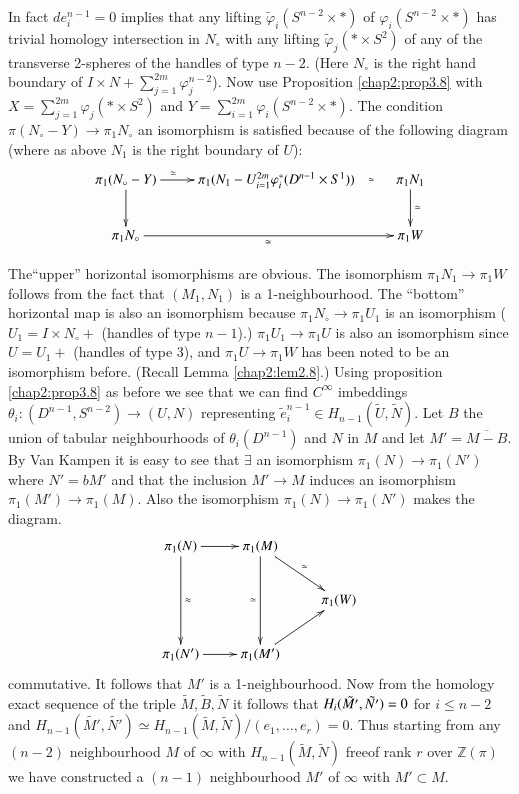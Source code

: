 In fact $de_i^{n-1} = 0$ implies that any lifting
$\tilde{\varphi}_i(S^{n-2} \times *)$ of $\varphi_i (S^{n-2}\times *)$ has
trivial homology intersection in $N_\circ$ with any lifting
$\tilde{\varphi}_j (* \times S^2)$ of any of the transverse 2-spheres of
the handles of type $n-2$. (Here $N_\circ$ is the right hand boundary of
$I \times N+ \sum \limits^{2m}_{j=1} \varphi_j^{n-2}$). Now use
Proposition \ref{chap2:prop3.8} with $X= \sum \limits^{2m}_{j=1} \varphi_j (* \times
S^2)$ and $Y= \sum \limits^{2m}_{i=1} \varphi_i (S^{n-2} \times *)$. The
condition $\pi(N_\circ -Y) \to \pi_1 N_\circ$ an isomorphism is satisfied
because of the following diagram (where as above $N_1$ is the right
boundary of $U$): 
\[
\xymatrix{
  \pi_1 (N_\circ - Y) \ar[r]^>>>>>>\simeq \ar[d] & \pi_1 (N_1 - U^{2m}_{i=1}
  \varphi^*_i (D^{n-1} \times S^1)) \ar@{}[r]|>>>>>>{\simeq} & \pi_1 N_1 \ar[d]^\simeq\\
\pi_1 N_\circ \ar[rr]_{\simeq} & & \pi_1 W
}
\]

The\pageoriginale ``upper'' horizontal isomorphisms are obvious. The
isomorphism  
$\pi_1 N_1 \to \pi_1 W$ follows from the fact that $(M_1, N_1)$ is a
1-neigh\-bourhood. The ``bottom'' horizontal map is also an isomorphism
because $\pi_1 N_\circ \to \pi_1 U_1$ is an isomorphism ($U_1 = I\times
N_\circ+$ (handles of type $n-1$).) $\pi_1 U_1 \to \pi_1 U$ is also an
isomorphism since $U=U_1+$ (handles of type 3), and $\pi_1 U \to \pi_1
W$ has been noted to be an isomorphism before. (Recall Lemma \ref{chap2:lem2.8}.)
Using proposition \ref{chap2:prop3.8} as before we see that we can find $C^\infty$
imbeddings $\theta_i: (D^{n-1}, S^{n-2}) \to (U, N)$ representing
$\tilde{e}_i^{n-1} \in H_{n-1}(\tilde{U}, \tilde{N})$. Let $B$
the union of tabular neighbourhoods of $\theta_i (D^{n-1})$ and $N$ in
$M$ and let $M' = \overline{M-B}$. By Van Kampen it is easy to see
that $\exists$ an isomorphism $\pi_1 (N)\to \pi_1 (N')$ where $N'=
bM'$ and that the inclusion $M' \to M$ induces an isomorphism $\pi_1
(M') \to \pi_1 (M)$. Also the isomorphism $\pi _1 (N)\to \pi_1 (N')$
makes the diagram. 
\[
\xymatrix{
\pi_1(N) \ar[r] \ar[dd]^\approx & \pi_1 (M) \ar[dr]^\simeq
\ar[dd]_\simeq & \\
&  & \pi_1 (W) \\
\pi_1 (N') \ar[r] & \pi_1 (M') \ar[ur]
}
\]
commutative. It follows that $M'$ is a 1-neighbourhood. Now from the
homology exact sequence of the triple $\tilde{M}, \tilde{B},
\tilde{N}$ it follows that $H_i (\tilde{M'},\break \tilde{N'}) = 0$ for $i
\leq n-2$ and $H_{n-1}(\tilde{ M' }, \tilde{N'}) \simeq H_{n-1}(\tilde{M},
\tilde{N})/ (e_1, \ldots, e_r)=0$. Thus starting from any $(n-2)$
neighbourhood $M$ of $\infty$ with $H_{n-1}(\tilde{M}, \tilde{N})$
free\pageoriginale of rank $r$ over $\mathbb{Z}(\pi)$ we have
constructed a $(n-1)$ neighbourhood $M'$ of $\infty$ with $M' \subset
M$.  

